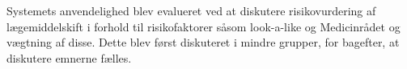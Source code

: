 Systemets anvendelighed blev evalueret ved at diskutere risikovurdering af lægemiddelskift i forhold til risikofaktorer såsom look-a-like og Medicinrådet og vægtning af disse. Dette blev først diskuteret i mindre grupper, for bagefter, at diskutere emnerne fælles.








